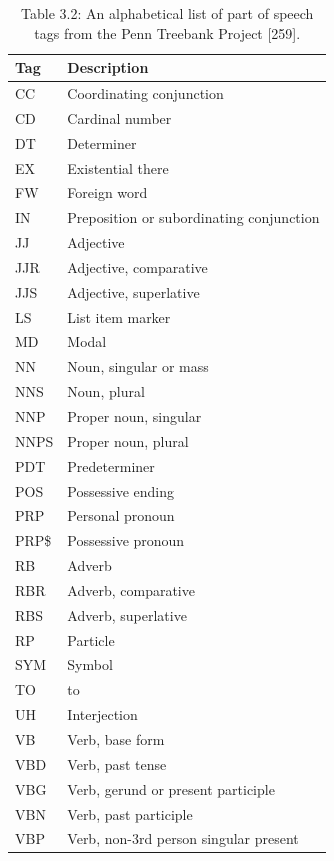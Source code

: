 \documentclass[10pt]{book}
\begin{document}
\begin{table}[h]
\begin{center}
\captionsetup{labelformat=empty}
\caption{Table 3.2: An alphabetical list of part of speech tags from the Penn Treebank Project [259].}
\begin{tabular}{|l|l|}
\hline
Tag & Description \\
\hline
CC & Coordinating conjunction \\
\hline
CD & Cardinal number \\
\hline
DT & Determiner \\
\hline
EX & Existential there \\
\hline
FW & Foreign word \\
\hline
IN & Preposition or subordinating conjunction \\
\hline
JJ & Adjective \\
\hline
JJR & Adjective, comparative \\
\hline
JJS & Adjective, superlative \\
\hline
LS & List item marker \\
\hline
MD & Modal \\
\hline
NN & Noun, singular or mass \\
\hline
NNS & Noun, plural \\
\hline
NNP & Proper noun, singular \\
\hline
NNPS & Proper noun, plural \\
\hline
PDT & Predeterminer \\
\hline
POS & Possessive ending \\
\hline
PRP & Personal pronoun \\
\hline
PRP\$ & Possessive pronoun \\
\hline
RB & Adverb \\
\hline
RBR & Adverb, comparative \\
\hline
RBS & Adverb, superlative \\
\hline
RP & Particle \\
\hline
SYM & Symbol \\
\hline
TO & to \\
\hline
UH & Interjection \\
\hline
VB & Verb, base form \\
\hline
VBD & Verb, past tense \\
\hline
VBG & Verb, gerund or present participle \\
\hline
VBN & Verb, past participle \\
\hline
VBP & Verb, non-3rd person singular present \\

\end{tabular}
\end{center}
\end{table}
\end{document}
